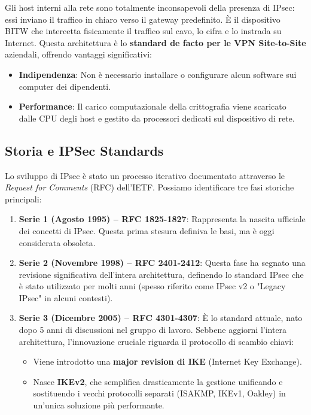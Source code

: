 \documentclass[a4paper, 11pt]{article}
\begin{document}
\begin{itemize}
    Gli host interni alla rete sono totalmente inconsapevoli della presenza di IPsec: essi inviano il traffico in chiaro verso il gateway predefinito. È il dispositivo BITW che intercetta fisicamente il traffico sul cavo, lo cifra e lo instrada su Internet.
    Questa architettura è lo \textbf{standard de facto per le VPN Site-to-Site} aziendali, offrendo vantaggi significativi:
    \begin{itemize}
        \item \textbf{Indipendenza}: Non è necessario installare o configurare alcun software sui computer dei dipendenti.
        \item \textbf{Performance}: Il carico computazionale della crittografia viene scaricato dalle CPU degli host e gestito da processori dedicati sul dispositivo di rete.
    \end{itemize}
\end{itemize}

\subsection{Storia e IPSec Standards}

Lo sviluppo di IPsec è stato un processo iterativo documentato attraverso le \textit{Request for Comments} (RFC) dell'IETF. Possiamo identificare tre fasi storiche principali:

\begin{enumerate}
    \item \textbf{Serie 1 (Agosto 1995) -- RFC 1825-1827}:
    Rappresenta la nascita ufficiale dei concetti di IPsec. Questa prima stesura definiva le basi, ma è oggi considerata obsoleta.

    \item \textbf{Serie 2 (Novembre 1998) -- RFC 2401-2412}:
    Questa fase ha segnato una revisione significativa dell'intera architettura, definendo lo standard IPsec che è stato utilizzato per molti anni (spesso riferito come IPsec v2 o "Legacy IPsec" in alcuni contesti).

    \item \textbf{Serie 3 (Dicembre 2005) -- RFC 4301-4307}:
    È lo standard attuale, nato dopo 5 anni di discussioni nel gruppo di lavoro. Sebbene aggiorni l'intera architettura, l'innovazione cruciale riguarda il protocollo di scambio chiavi:
    \begin{itemize}
        \item Viene introdotto una \textbf{major revision di IKE} (Internet Key Exchange).
        \item Nasce \textbf{IKEv2}, che semplifica drasticamente la gestione unificando e sostituendo i vecchi protocolli separati (ISAKMP, IKEv1, Oakley) in un'unica soluzione più performante.
    \end{itemize}
\end{enumerate}
\end{document}
